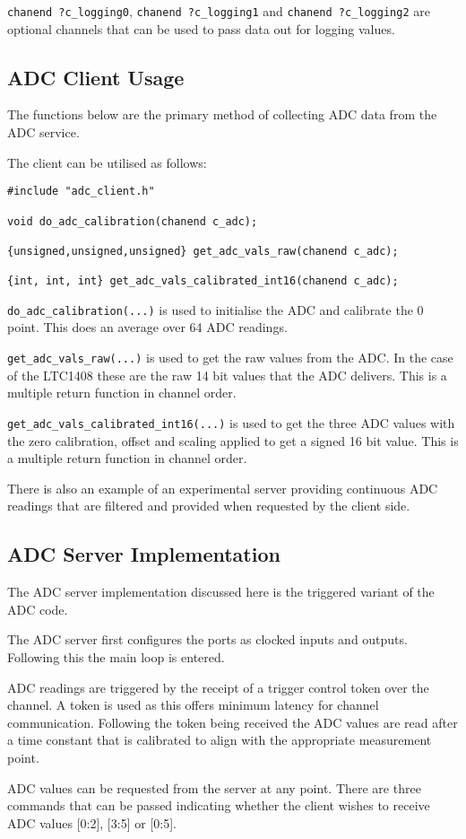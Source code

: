 \verb=chanend ?c_logging0=, \verb=chanend ?c_logging1= and \verb=chanend ?c_logging2= are optional channels that can be used to pass data out for logging values.

\subsection{ADC Client Usage}
The functions below are the primary method of collecting ADC data from the ADC service. 

The client can be utilised as follows:

\begin{lstlisting}
#include "adc_client.h"

void do_adc_calibration(chanend c_adc);

{unsigned,unsigned,unsigned} get_adc_vals_raw(chanend c_adc);

{int, int, int} get_adc_vals_calibrated_int16(chanend c_adc);
\end{lstlisting}

\verb=do_adc_calibration(...)= is used to initialise the ADC and calibrate the 0 point. This does an average over 64 ADC readings.

\verb=get_adc_vals_raw(...)= is used to get the raw values from the ADC. In the case of the LTC1408 these are the raw 14 bit values that the ADC delivers. This is a multiple return function in channel order.

\verb=get_adc_vals_calibrated_int16(...)= is used to get the three ADC values with the zero calibration, offset and scaling applied to get a signed 16 bit value. This is a multiple return function in channel order.

There is also an example of an experimental server providing continuous ADC readings that are filtered and provided when requested by the client side.

\subsection{ADC Server Implementation}
The ADC server implementation discussed here is the triggered variant of the ADC code.

The ADC server first configures the ports as clocked inputs and outputs. Following this the main loop is entered. 

ADC readings are triggered by the receipt of a trigger control token over the channel. A token is used as this offers minimum latency for channel communication. Following the token being received the ADC values are read after a time constant that is calibrated to align with the appropriate measurement point.

ADC values can be requested from the server at any point. There are three commands that can be passed indicating whether the client wishes to receive ADC values [0:2], [3:5] or [0:5].
